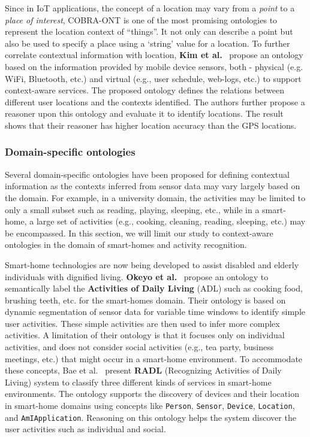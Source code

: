 \documentclass{elsart}  %
\begin{document}
Since in IoT applications, the concept of a location may vary from a \textit{point} to a \textit{place of interest}, COBRA-ONT is one of the most promising ontologies to represent the location context of ``things''. It not only can describe a point but also be used to specify a place using a `string' value for a location.
To further correlate contextual information with location, \textbf{Kim et al.}~\cite{locationReasoning} propose an ontology based on the information provided by mobile device sensors, both - physical (e.g. WiFi, Bluetooth, etc.) and virtual (e.g., user schedule, web-logs, etc.)  to support context-aware services. The proposed ontology defines the relations between different user locations and the contexts identified. The authors further propose a reasoner upon this ontology and evaluate it to identify locations. The result shows that their reasoner has higher location accuracy than the GPS locations.

\subsubsection{Domain-specific ontologies}
Several domain-specific ontologies have been proposed for defining contextual information as the contexts inferred from sensor data may vary largely based on the domain. For example, in a university domain, the activities may be limited to only a small subset such as reading, playing, sleeping, etc., while in a smart-home, a large set of activities (e.g., cooking, cleaning, reading, sleeping, etc.) may be encompassed. In this section, we will limit our study to context-aware ontologies in the domain of smart-homes and activity recognition.
 
Smart-home technologies are now being developed to assist disabled and elderly individuals with dignified living. \textbf{Okeyo et al.}~\cite{Okeyo2014155} propose an ontology to semantically label the \textbf{Activities of Daily Living} (ADL) such as cooking food, brushing teeth, etc. for the smart-homes domain. Their ontology is based on dynamic segmentation of sensor data for variable time windows to identify simple user activities. These simple activities are then used to infer more complex activities. A limitation of their ontology is that it focuses only on individual activities, and does not consider social activities (e.g., tea party, business meetings, etc.) that might occur in a smart-home environment. To accommodate these concepts, Bae et al.~\cite{Bae201432} present \textbf{RADL} (Recognizing Activities of Daily Living) system to classify three different kinds of services in smart-home environments. The ontology supports the discovery of devices and their location in smart-home domains using concepts like \texttt{Person}, \texttt{Sensor}, \texttt{Device}, \texttt{Location}, and \texttt{AmIApplication}. Reasoning on this ontology helps the system discover the user activities such as individual and social.
\end{document}
